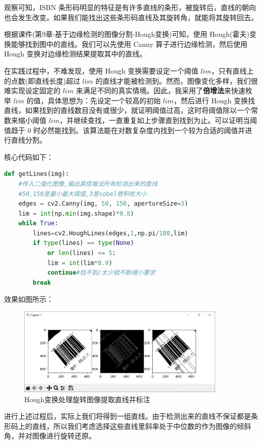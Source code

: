 \documentclass{ctexart}
\begin{document}
观察可知，ISBN 条形码明显的特征是有许多直线的条形，被旋转后，直线的朝向也会发生改变。如果我们能找出这些条形码直线及其旋转角，就能将其旋转回去。

根据课件(第9章-基于边缘检测的图像分割-Hough变换)可知，使用 Hough(霍夫)变换能够找到图中的直线。我们可以先使用 Canny 算子进行边缘检测，然后使用 Hough 变换对边缘检测结果提取其中的直线。

在实践过程中，不难发现，使用 Hough 变换需要设定一个阈值 $lim$，只有直线上的点数(即直线长度)超过 $lim$ 的直线才能被检测到。然而，图像变化多样，我们很难实现设定固定的 $lim$ 来满足不同的真实情境。因此，我采用了\textbf{倍增法}来快速枚举 $lim$ 的值，具体思想为：先设定一个较高的初始 $lim$，然后进行 Hough 变换找直线，如果找到的直线数目没有或很少，就证明阈值过高，这时将阈值除以一个常数来缩小阈值 $lim$，并继续查找，一直重复如上步骤直到找到为止。可以证明当阈值趋于 $0$ 时必然能找到。该算法能在对数复杂度内找到一个较为合适的阈值并进行直线分割。

核心代码如下：

\begin{lstlisting}[language=python]
def getLines(img):
    #传入二值化图像,输出其倍增法所有检测出来的直线
    #50,150是最小最大阈值,3是sobel卷积核大小
    edges = cv2.Canny(img, 50, 150, apertureSize=3)
    lim = int(np.min(img.shape)*0.8)
    while True:
        lines=cv2.HoughLines(edges,1,np.pi/180,lim)
        if type(lines) == type(None) 
            or len(lines) <= 5:
            lim = int(lim*0.9)
            continue#找不到/太少就不断缩小要求
        break
\end{lstlisting}

效果如图所示：

\begin{figure}[H]
    \centering
    \includegraphics[height=120pt]{hough}
    \caption{Hough变换处理旋转图像提取直线并标注}
\end{figure}

进行上述过程后，实际上我们将得到一组直线。由于检测出来的直线不保证都是条形码上的直线，所以我们考虑选择这些直线里斜率处于中位数的作为图像的倾斜角，并对图像进行旋转还原。
\end{document}
